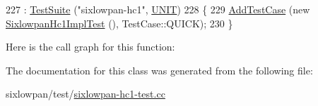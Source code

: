 \begin{DoxyCode}
227   : \hyperlink{classns3_1_1TestSuite_a904b0c40583b744d30908aeb94636d1a}{TestSuite} (\textcolor{stringliteral}{"sixlowpan-hc1"}, \hyperlink{classns3_1_1TestSuite_a1ebfcab34ec8161e085e8e3a1855eae0a3885375a3787abf60431f8454b3cadbd}{UNIT})
228 \{
229   \hyperlink{classns3_1_1TestCase_a3718088e3eefd5d6454569d2e0ddd835}{AddTestCase} (\textcolor{keyword}{new} \hyperlink{classSixlowpanHc1ImplTest}{SixlowpanHc1ImplTest} (), TestCase::QUICK);
230 \}
\end{DoxyCode}


Here is the call graph for this function\+:




The documentation for this class was generated from the following file\+:\begin{DoxyCompactItemize}
\item 
sixlowpan/test/\hyperlink{sixlowpan-hc1-test_8cc}{sixlowpan-\/hc1-\/test.\+cc}\end{DoxyCompactItemize}
